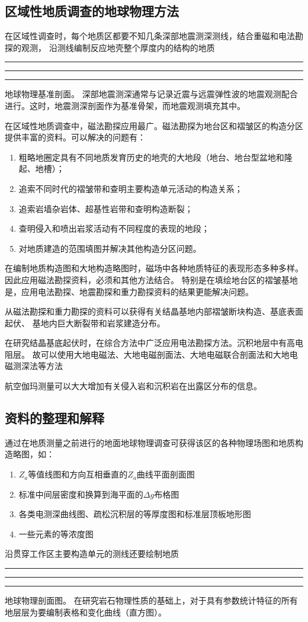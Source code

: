 \documentclass[hyperref,UTF-8]{ctexart}
\newcommand{\cndash}{\rule{0.2em}{0pt}\rule[0.35em]{1.6em}{0.05em}\rule{0.2em}{0pt}}
\begin{document}
\subsection{区域性地质调查的地球物理方法}
在区域性调查时，每个地质区都要不知几条深部地震测深测线，结合重磁和电法勘探的观测，
沿测线编制反应地壳整个厚度内的结构的地质\cndash 地球物理基准剖面。
深部地震测深通常与记录近震与远震弹性波的地震观测配合进行。这时，地震测深剖面作为基准骨架，而地震观测填充其中。

在区域性地质调查中，磁法勘探应用最广。磁法勘探为地台区和褶皱区的构造分区提供丰富的资料。可以解决的问题有：
\begin{enumerate}
\item 粗略地圈定具有不同地质发育历史的地壳的大地段（地台、地台型盆地和隆起、地槽）；
\item 追索不同时代的褶皱带和查明主要构造单元活动的构造关系；
\item 追索岩墙杂岩体、超基性岩带和查明构造断裂；
\item 查明侵入和喷出岩浆活动有不同程度的表现的地段；
\item 对地质建造的范围填图并解决其他构造分区问题。
\end{enumerate}
在编制地质构造图和大地构造略图时，磁场中各种地质特征的表现形态多种多样。因此应用磁法勘探资料，必须和其他方法结合。
特别是在填绘地台区的褶皱基地是，应用电法勘探、地震勘探和重力勘探资料的结果更能解决问题。

从磁法勘探和重力勘探的资料可以获得有关结晶基地内部褶皱断块构造、基底表面起伏、
基地内巨大断裂带和岩浆建造分布。

在研究结晶基底起伏时，在综合方法中广泛应用电法勘探方法。沉积地层中有高电阻层。
故可以使用大地电磁法、大地电磁剖面法、大地电磁联合剖面法和大地电磁测深法等方法

航空伽玛测量可以大大增加有关侵入岩和沉积岩在出露区分布的信息。
\subsection{资料的整理和解释}
通过在地质测量之前进行的地面地球物理调查可获得该区的各种物理场图和地质构造略图，如：
\begin{enumerate}
\item $Z_a$等值线图和方向互相垂直的$Z_a$曲线平面剖面图
\item 标准中间层密度和换算到海平面的$\Delta g$布格图
\item 各类电测深曲线图、疏松沉积层的等厚度图和标准层顶板地形图
\item 一些元素的等浓度图
\end{enumerate}
沿贯穿工作区主要构造单元的测线还要绘制地质\cndash 地球物理剖面图。
在研究岩石物理性质的基础上，对于具有参数统计特征的所有地层层为要编制表格和变化曲线（直方图）。
\end{document}
